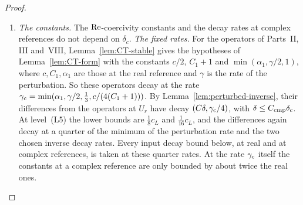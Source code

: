 \begin{proof}
\begin{enumerate}[label=(\roman*)]
\item \emph{The constants.} The $\operatorname{Re}$-coercivity constants and the decay rates at complex references do not depend on $\delta_c$. \emph{The fixed rates.} For the operators of Parts~II, III and~VIII, Lemma~\ref{lem:CT-stable} gives the hypotheses of Lemma~\ref{lem:CT-form} with the constants $c/2$, $C_1+1$ and $\min(\alpha_1,\gamma/2,1)$, where $c,C_1,\alpha_1$ are those at the real reference and $\gamma$ is the rate of the perturbation. So these operators decay at the rate $\gamma_{\rm c}=\min(\alpha_1,\gamma/2,\frac13,c/(4(C_1+1)))$. By Lemma~\ref{lem:perturbed-inverse}, their differences from the operators at $U_r$ have decay $(C\delta,\gamma_{\rm c}/4)$, with $\delta\le C_{\rm cmp}\delta_c$. At level~(L5) the lower bounds are $\frac18c_L$ and $\frac1{16}c_L$, and the differences again decay at a quarter of the minimum of the perturbation rate and the two chosen inverse decay rates. Every input decay bound below, at real and at complex references, is taken at these quarter rates. At the rate $\gamma_{\rm c}$ itself the constants at a complex reference are only bounded by about twice the real ones.


\end{enumerate}
\end{proof}
